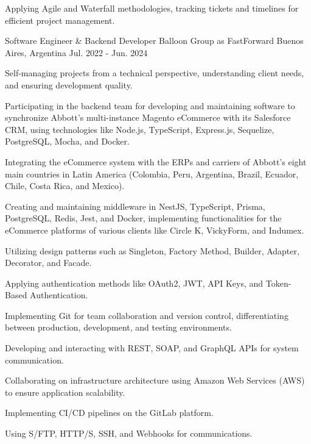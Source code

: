 \begin{cventries}
{\begin{cvitems}
        \item {Applying Agile and Waterfall methodologies, tracking tickets and timelines for efficient project management.}
      \end{cvitems}
    }
  \vspace{5.5mm}
\cventry
    {Software Engineer \& Backend Developer} %
    {Balloon Group as FastForward} %
    {Buenos Aires, Argentina} %
    {Jul. 2022 - Jun. 2024} %
    {
      \begin{cvitems} %
        \item {Self-managing projects from a technical perspective, understanding client needs, and ensuring development quality.}
        \item {Participating in the backend team for developing and maintaining software to synchronize Abbott's multi-instance Magento eCommerce with its Salesforce CRM, using technologies like Node.js, TypeScript, Express.js, Sequelize, PostgreSQL, Mocha, and Docker.}
        \item {Integrating the eCommerce system with the ERPs and carriers of Abbott's eight main countries in Latin America (Colombia, Peru, Argentina, Brazil, Ecuador, Chile, Costa Rica, and Mexico).}
        \item {Creating and maintaining middleware in NestJS, TypeScript, Prisma, PostgreSQL, Redis, Jest, and Docker, implementing functionalities for the eCommerce platforms of various clients like Circle K, VickyForm, and Indumex.}
        \item {Utilizing design patterns such as Singleton, Factory Method, Builder, Adapter, Decorator, and Facade.}
        \item {Applying authentication methods like OAuth2, JWT, API Keys, and Token-Based Authentication.}
        \item {Implementing Git for team collaboration and version control, differentiating between production, development, and testing environments.}
        \item {Developing and interacting with REST, SOAP, and GraphQL APIs for system communication.}
        \item {Collaborating on infrastructure architecture using Amazon Web Services (AWS) to ensure application scalability.}
        \item {Implementing CI/CD pipelines on the GitLab platform.}
        \item {Using S/FTP, HTTP/S, SSH, and Webhooks for communications.}

\end{cvitems}}
\end{cventries}
